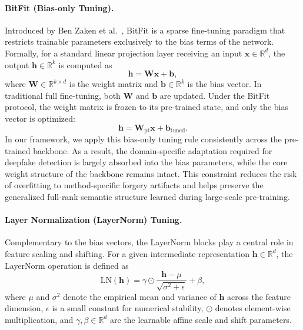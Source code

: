 \documentclass[fonts]{icst}
\begin{document}
\paragraph{BitFit (Bias-only Tuning).}
Introduced by Ben Zaken et al.~\cite{benzaken2022bitfit}, BitFit is a sparse fine-tuning paradigm that restricts trainable parameters exclusively to the bias terms of the network.
Formally, for a standard linear projection layer receiving an input $\mathbf{x} \in \mathbb{R}^{d}$, the output $\mathbf{h} \in \mathbb{R}^{k}$ is computed as
\begin{equation}
    \mathbf{h} = \mathbf{W}\mathbf{x} + \mathbf{b},
\end{equation}
where $\mathbf{W} \in \mathbb{R}^{k \times d}$ is the weight matrix and $\mathbf{b} \in \mathbb{R}^{k}$ is the bias vector.
In traditional full fine-tuning, both $\mathbf{W}$ and $\mathbf{b}$ are updated.
Under the BitFit protocol, the weight matrix is frozen to its pre-trained state, and only the bias vector is optimized:
\begin{equation}
    \mathbf{h} = \mathbf{W}_{\text{pt}}\mathbf{x} + \mathbf{b}_{\text{tuned}}.
\end{equation}
In our framework, we apply this bias-only tuning rule consistently across the pre-trained backbone.
As a result, the domain-specific adaptation required for deepfake detection is largely absorbed into the bias parameters, while the core weight structure of the backbone remains intact.
This constraint reduces the risk of overfitting to method-specific forgery artifacts and helps preserve the generalized full-rank semantic structure learned during large-scale pre-training.

\paragraph{Layer Normalization (LayerNorm) Tuning.}
Complementary to the bias vectors, the LayerNorm blocks play a central role in feature scaling and shifting.
For a given intermediate representation $\mathbf{h} \in \mathbb{R}^{d}$, the LayerNorm operation is defined as
\begin{equation}
    \mathrm{LN}(\mathbf{h}) = \gamma \odot \frac{\mathbf{h} - \mu}{\sqrt{\sigma^2 + \epsilon}} + \beta,
\end{equation}
where $\mu$ and $\sigma^2$ denote the empirical mean and variance of $\mathbf{h}$ across the feature dimension, $\epsilon$ is a small constant for numerical stability, $\odot$ denotes element-wise multiplication, and $\gamma, \beta \in \mathbb{R}^{d}$ are the learnable affine scale and shift parameters.
\end{document}
